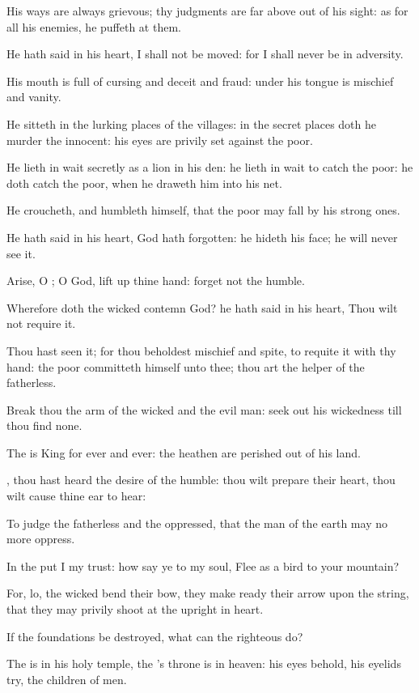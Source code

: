 \Verse His ways are always grievous; thy judgments are far above out of his sight: as for all his enemies, he puffeth at them.

\Verse He hath said in his heart, I shall not be moved: for I shall never be in adversity.

\Verse His mouth is full of cursing and deceit and fraud: under his tongue is mischief and vanity.

\Verse He sitteth in the lurking places of the villages: in the secret places doth he murder the innocent: his eyes are privily set against the poor.

\Verse He lieth in wait secretly as a lion in his den: he lieth in wait to catch the poor: he doth catch the poor, when he draweth him into his net.

\Verse He croucheth, and humbleth himself, that the poor may fall by his strong ones.

\Verse He hath said in his heart, God hath forgotten: he hideth his face; he will never see it.

\Verse Arise, O \LORD; O God, lift up thine hand: forget not the humble.

\Verse Wherefore doth the wicked contemn God? he hath said in his heart, Thou wilt not require it.

\Verse Thou hast seen it; for thou beholdest mischief and spite, to requite it with thy hand: the poor committeth himself unto thee; thou art the helper of the fatherless.

\Verse Break thou the arm of the wicked and the evil man: seek out his wickedness till thou find none.

\Verse The \LORD is King for ever and ever: the heathen are perished out of his land.

\Verse \LORD, thou hast heard the desire of the humble: thou wilt prepare their heart, thou wilt cause thine ear to hear:

\Verse To judge the fatherless and the oppressed, that the man of the earth may no more oppress.




\Chapter
\Verse In the \LORD put I my trust: how say ye to my soul, Flee as a bird to your mountain?

\Verse For, lo, the wicked bend their bow, they make ready their arrow upon the string, that they may privily shoot at the upright in heart.

\Verse If the foundations be destroyed, what can the righteous do?

\Verse The \LORD is in his holy temple, the \LORD's throne is in heaven: his eyes behold, his eyelids try, the children of men.

